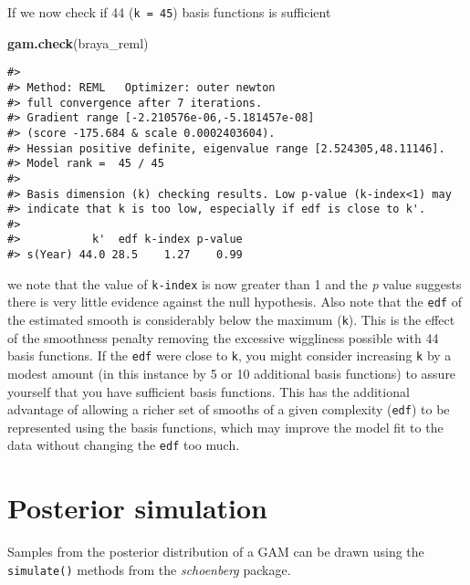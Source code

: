 \documentclass[12pt,]{article}
\newenvironment{Shaded}{\begin{snugshade}}{\end{snugshade}}
\newcommand{\KeywordTok}[1]{\textcolor[rgb]{0.13,0.29,0.53}{\textbf{{#1}}}}
\newcommand{\NormalTok}[1]{{#1}}
\begin{document}
If we now check if 44 (\texttt{k\ =\ 45}) basis functions is sufficient

\begin{Shaded}
\begin{Highlighting}[]
\KeywordTok{gam.check}\NormalTok{(braya_reml)}
\end{Highlighting}
\end{Shaded}

\begin{verbatim}
#> 
#> Method: REML   Optimizer: outer newton
#> full convergence after 7 iterations.
#> Gradient range [-2.210576e-06,-5.181457e-08]
#> (score -175.684 & scale 0.0002403604).
#> Hessian positive definite, eigenvalue range [2.524305,48.11146].
#> Model rank =  45 / 45 
#> 
#> Basis dimension (k) checking results. Low p-value (k-index<1) may
#> indicate that k is too low, especially if edf is close to k'.
#> 
#>           k'  edf k-index p-value
#> s(Year) 44.0 28.5    1.27    0.99
\end{verbatim}

we note that the value of \texttt{k-index} is now greater than 1 and the
\emph{p} value suggests there is very little evidence against the null
hypothesis. Also note that the \texttt{edf} of the estimated smooth is
considerably below the maximum (\texttt{k\textquotesingle{}}). This is
the effect of the smoothness penalty removing the excessive wiggliness
possible with 44 basis functions. If the \texttt{edf} were close to
\texttt{k\textquotesingle{}}, you might consider increasing \texttt{k}
by a modest amount (in this instance by 5 or 10 additional basis
functions) to assure yourself that you have sufficient basis functions.
This has the additional advantage of allowing a richer set of smooths of
a given complexity (\texttt{edf}) to be represented using the basis
functions, which may improve the model fit to the data without changing
the \texttt{edf} too much.

\section{Posterior simulation}\label{posterior-simulation}

Samples from the posterior distribution of a GAM can be drawn using the
\texttt{simulate()} methods from the \emph{schoenberg} package.
\end{document}
